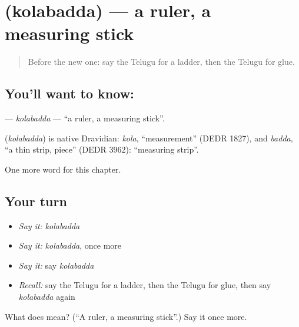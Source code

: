 \section[\texorpdfstring{\te{కొలబద్ద} (kolabadda)}{కొలబద్ద (kolabadda)}]{ (kolabadda) — a ruler, a measuring stick}

\label{lesson:TE-C231-kolabadda}



\begin{quote}
Before the new one: say the Telugu for a ladder, then the Telugu for glue.
\end{quote}

\subsection*{You'll want to know: }
\textbf{} — \emph{kolabadda} — \textquotedblleft{}a ruler, a measuring stick\textquotedblright{}.

\begin{cousinweb}
\textbf{} (\emph{kolabadda}) is native Dravidian: \emph{kola}, \textquotedblleft{}measurement\textquotedblright{} (DEDR 1827), and \emph{badda}, \textquotedblleft{}a thin strip, piece\textquotedblright{} (DEDR 3962): \textquotedblleft{}measuring strip\textquotedblright{}.
\end{cousinweb}

\begin{grammarlens}[title={What you've built}]
One more word for this chapter.
\end{grammarlens}

\subsection*{Your turn}
\begin{itemize}
\raggedright
  \item \emph{Say it:} \emph{kolabadda}
  \item \emph{Say it:} \emph{kolabadda}, once more
  \item \emph{Say it:} say \emph{kolabadda}
  \item \emph{Recall:} say the Telugu for a ladder, then the Telugu for glue, then say \emph{kolabadda} again
\end{itemize}

\begin{tcolorbox}[breakable,colback=teal!4,colframe=teal!35!black,title={Before you move on}]
What does  mean? (\textquotedblleft{}A ruler, a measuring stick\textquotedblright{}.) Say it once more.
\end{tcolorbox}
